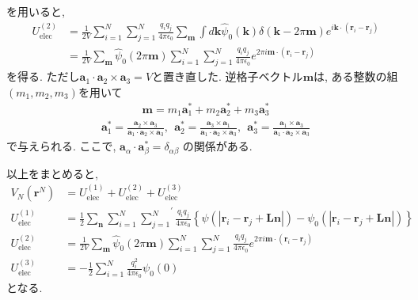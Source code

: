 を用いると,
\begin{align}
    U_{\mathrm{elec}}^{(2)}
 &=
    \frac{1}{2V} \sum_{i=1}^{N} \sum_{j=1}^{N}
    \frac{q_{i}q_{j}}{4 \pi \epsilon_{0}} \sum_{\bm{m}}
    \int d \bm{k} \hat{\psi}_{0}(\bm{k})
    \delta (\bm{k} - 2 \pi \bm{m})
    e^{i \bm{k} \cdot (\bm{r}_{i} - \bm{r}_{j})}
 \\
 &=
    \frac{1}{2V}
    \sum_{\bm{m}} \hat{\psi}_{0}(2 \pi \bm{\bm{m}})
    \sum_{i=1}^{N} \sum_{j=1}^{N}
    \frac{q_{i}q_{j}}{4 \pi \epsilon_{0}}
    e^{2 \pi i \bm{m} \cdot (\bm{r}_{i} - \bm{r}_{j})}
 \label{eq:Ewald7}
\end{align}
を得る. ただし$\bm{a}_{1} \cdot \bm{a}_{2} \times \bm{a}_{3}=V$と置き直した. 
逆格子ベクトル$\bm{m}$は, ある整数の組$(m_{1},m_{2},m_{3})$を用いて
\begin{align}
   \bm{m}
 =
    m_{1} \bm{a}_{1}^{*} + m_{2} \bm{a}_{2}^{*} + m_{3} \bm{a}_{3}^{*}
 \label{eq:Ewald8}
\end{align}
\begin{align}
   \bm{a}_{1}^{*}
 =
   \frac{\bm{a}_{2} \times \bm{a}_{3}}
        {\bm{a}_{1} \cdot \bm{a}_{2} \times \bm{a}_{3}}
 , ~~
   \bm{a}_{2}^{*}
 =
   \frac{\bm{a}_{3} \times \bm{a}_{1}}
        {\bm{a}_{1} \cdot \bm{a}_{2} \times \bm{a}_{3}}
 , ~~
   \bm{a}_{3}^{*}
 =
   \frac{\bm{a}_{1} \times \bm{a}_{3}}
        {\bm{a}_{1} \cdot \bm{a}_{2} \times \bm{a}_{3}}
 \label{eq:Ewald9}
\end{align}
で与えられる. ここで, $\bm{a}_{\alpha} \cdot \bm{a}_{\beta}^{*}=\delta_{\alpha \beta}$
の関係がある.

以上をまとめると,
\begin{align}
    V_{N} (\bm{r}^{N})
 &=
    U_{\mathrm{elec}}^{(1)} + U_{\mathrm{elec}}^{(2)} + U_{\mathrm{elec}}^{(3)}
 \label{eq:Ewald10.1}
 \\
    U_{\mathrm{elec}}^{(1)}
 &=
    \frac{1}{2} \sum_{\bm{n}} \sum_{i=1}^{N} \left.\sum_{j=1}^{N}\right.^{\prime}
    \frac{q_{i} q_{j}}{4 \pi \epsilon_{0}}
    \left\{
            \psi( |\bm{r}_{i} - \bm{r}_{j} + \bm{Ln}| )
           -
            \psi_{0}( |\bm{r}_{i} - \bm{r}_{j} + \bm{Ln}| )
    \right\}
 \label{eq:Ewald10.2}
 \\
    U_{\mathrm{elec}}^{(2)}
 &=
    \frac{1}{2V} \sum_{\bm{m}} \hat{\psi}_{0}(2 \pi \bm{m})
    \sum_{i=1}^{N} \sum_{j=1}^{N}
    \frac{q_{i}q_{j}}{4 \pi \epsilon_{0}}
    e^{2 \pi i \bm{m} \cdot (\bm{r}_{i} - \bm{r}_{j})}
 \label{eq:Ewald10.3}
 \\
    U_{\mathrm{elec}}^{(3)}
 &=
   -\frac{1}{2} \sum_{i=1}^{N} \frac{q_{i}^2}{4 \pi \epsilon_{0}} \psi_{0}(0)
 \label{eq:Ewald10.4}
\end{align}
となる.

